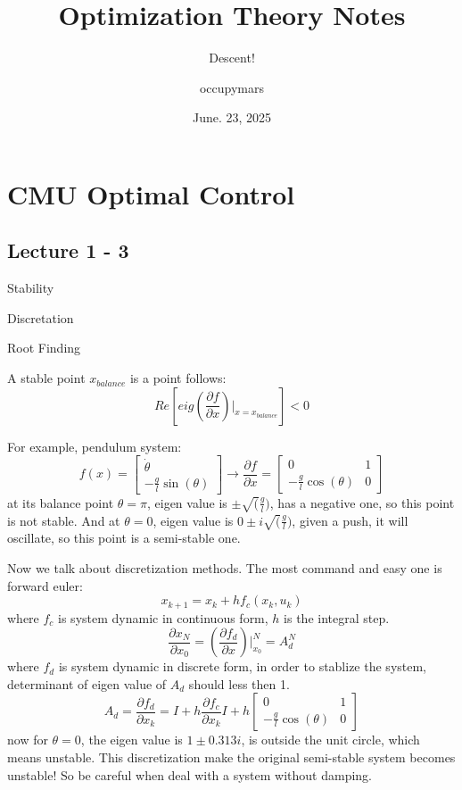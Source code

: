 \documentclass[10pt]{elegantbook}
\title{Optimization Theory Notes}
\subtitle{Descent!}
\author{occupymars}
\date{June. 23, 2025}
\begin{document}
\maketitle

\frontmatter
\tableofcontents

\mainmatter

\chapter{CMU Optimal Control}

\section{Lecture 1 - 3}

\begin{introduction}
    \item Stability
    \item Discretation
    \item Root Finding
\end{introduction}

A stable point $x_{balance}$ is a point follows:
\[ Re[eig(\frac{\partial f}{\partial x})|_{x = x_{balance}}] < 0 \]

For example, pendulum system:
\[
f(x) = \begin{bmatrix}
    \dot \theta \\ -\frac{g}{l} \sin(\theta)
\end{bmatrix} \rightarrow \frac{\partial f}{\partial x} = \begin{bmatrix}
    0 & 1 \\
    -\frac{g}{l} \cos(\theta) & 0
\end{bmatrix}
\]
at its balance point $\theta = \pi$, eigen value is $\pm \sqrt(\frac{g}{l})$, has a negative one, so this point is
not stable. And at $\theta = 0$, eigen value is $0 \pm i\sqrt(\frac{g}{l})$, given a push, it will oscillate, so this
point is a semi-stable one.

Now we talk about discretization methods. The most command and easy one is forward euler:
\[ x_{k+1} = x_k + hf_c(x_k, u_k) \]
where $f_c$ is system dynamic in continuous form, $h$ is the integral step.
\[ \frac{\partial x_N}{\partial x_0} = (\frac{\partial f_d}{\partial x})|_{x_0}^N = A_d^N \]
where $f_d$ is system dynamic in discrete form, in order to stablize the system, determinant of eigen value 
of $A_d$ should less then 1.
\[ A_d = \frac{\partial f_d}{\partial x_k} = I + h \frac{\partial f_c}{\partial x_k} 
I + h \begin{bmatrix}
    0 & 1 \\
    -\frac{g}{l} \cos(\theta) & 0
\end{bmatrix} \]
now for $\theta = 0$, the eigen value is $1 \pm 0.313i$, is outside the unit circle, which means unstable.
This discretization make the original semi-stable system becomes unstable! So be careful when deal with a 
system without damping.
\end{document}

